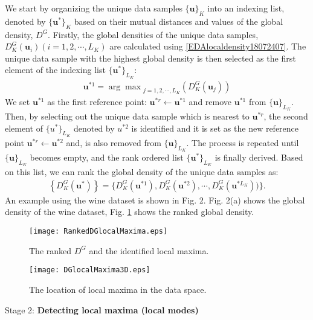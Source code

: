 {We start by organizing the unique data samples $\{\bm u\}_K$ into an indexing list, denoted by $\{\bm u^*\}_K$ based on their mutual distances and values of the global density, $D^G$.
Firstly, the global densities of the unique data samples, $D^G_K(\bm u_i) (i = 1, 2, \cdots, L_K)$ are calculated using \eqref{EDAlocaldensity18072407}. The unique data sample with the highest global density is then selected as the first element of the indexing list $\{\bm u^*\}_{L_K}$:
\begin{align}\label{EDAlocaldensity18072408}
 \bm u^{*1} = {\arg \max}_{j=1,2,\cdots,L_K} \left(D^G_K(\bm u_j)\right)
\end{align}
We set $\bm u^{*1}$ as the first reference point: $\bm u^{*r} \leftarrow \bm u^{*1}$ and remove $ \bm u^{*1}$ from $\{\bm u\}_{L_K}$. Then, by selecting out the unique data
sample which is nearest to $\bm u^{*r}$, the second element of $\{u^*\}_{L_K}$ denoted by $u^{*2}$ is identified and it is set as the new reference point $\bm u^{*r} \leftarrow \bm u^{*2}$ and, is also removed from $\{\bm u\}_{L_K}$. The process is repeated until $\{\bm u\}_{L_K}$ becomes empty, and the rank ordered list $\{\bm u^*\}_{L_K}$ is finally derived. Based on this list, we can rank the global density of the unique data samples as:
\begin{align}\label{EDAlocaldensity18072409}
 \left\{D^G_K(\bm u^*)\right\} =\{D^G_K(\bm u^{*1}),D^G_K(\bm u^{*2}),\cdots, D^G_K(\bm u^{*L_K}) )\} .
\end{align}
An example using the wine dataset \cite{AeberhardWinedata1992} is shown in Fig. 2. Fig. 2(a) shows the global density of the wine dataset, Fig. \ref{RankedDGlocalMaxima0726}
shows the ranked global density.
\begin{figure}[H]
\centering
  \texttt{[image: RankedDGlocalMaxima.eps]}
  \caption{The ranked $D^G$ and the identified local maxima.}
  \label{RankedDGlocalMaxima0726}
\end{figure}
\begin{figure}[H]
\centering
  \texttt{[image: DGlocalMaxima3D.eps]}
  \caption{The location of local maxima in the data space.}
  \label{DGlocalMaxima3D0726}
\end{figure}
Stage 2: \textbf{Detecting local maxima (local modes)}

}
